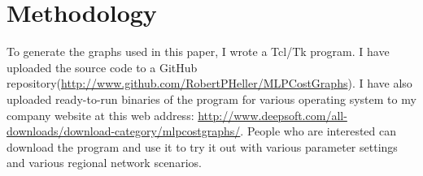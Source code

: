 \documentclass[12pt]{article}
\begin{document}
\appendix

\section{Methodology}

To generate the graphs used in this paper, I wrote a Tcl/Tk
program\cite{MLPCostGraphs}. I have uploaded the source code to a GitHub
repository(\url{http://www.github.com/RobertPHeller/MLPCostGraphs}). I have
also uploaded ready-to-run binaries of the program for various operating
system to my company website at this web address:
\url{http://www.deepsoft.com/all-downloads/download-category/mlpcostgraphs/}.
People who are interested can download the program and use it to try it out
with various parameter settings and various regional network scenarios.

\clearpage
{}


\clearpage
{}
\printindex
\end{document}
